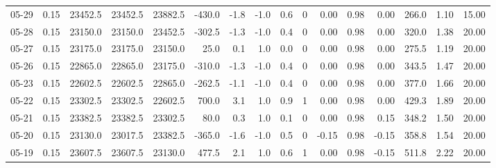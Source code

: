 \begin{threeparttable}
{\begin{tabular}{lrrrrrrrrrrrrrrr}
  05-29 &     0.15 & 23452.5 & 23452.5 & 23882.5 &     -430.0 &           -1.8 &                     -1.0 &                 0.6 &              0 &       0.00 &      0.98 &           0.00 &            266.0 &            1.10 &                  15.00 \\
  05-28 &     0.15 & 23150.0 & 23150.0 & 23452.5 &     -302.5 &           -1.3 &                     -1.0 &                 0.4 &              0 &       0.00 &      0.98 &           0.00 &            320.0 &            1.38 &                  20.00 \\
  05-27 &     0.15 & 23175.0 & 23175.0 & 23150.0 &       25.0 &            0.1 &                      1.0 &                 0.0 &              0 &       0.00 &      0.98 &           0.00 &            275.5 &            1.19 &                  20.00 \\
  05-26 &     0.15 & 22865.0 & 22865.0 & 23175.0 &     -310.0 &           -1.3 &                     -1.0 &                 0.4 &              0 &       0.00 &      0.98 &           0.00 &            343.5 &            1.47 &                  20.00 \\
  05-23 &     0.15 & 22602.5 & 22602.5 & 22865.0 &     -262.5 &           -1.1 &                     -1.0 &                 0.4 &              0 &       0.00 &      0.98 &           0.00 &            377.0 &            1.66 &                  20.00 \\
  05-22 &     0.15 & 23302.5 & 23302.5 & 22602.5 &      700.0 &            3.1 &                      1.0 &                 0.9 &              1 &       0.00 &      0.98 &           0.00 &            429.3 &            1.89 &                  20.00 \\
  05-21 &     0.15 & 23382.5 & 23382.5 & 23302.5 &       80.0 &            0.3 &                      1.0 &                 0.1 &              0 &       0.00 &      0.98 &           0.15 &            348.2 &            1.50 &                  20.00 \\
  05-20 &     0.15 & 23130.0 & 23017.5 & 23382.5 &     -365.0 &           -1.6 &                     -1.0 &                 0.5 &              0 &      -0.15 &      0.98 &          -0.15 &            358.8 &            1.54 &                  20.00 \\
  05-19 &     0.15 & 23607.5 & 23607.5 & 23130.0 &      477.5 &            2.1 &                      1.0 &                 0.6 &              1 &       0.00 &      0.98 &          -0.15 &            511.8 &            2.22 &                  20.00 \\

\end{tabular}}
\end{threeparttable}
